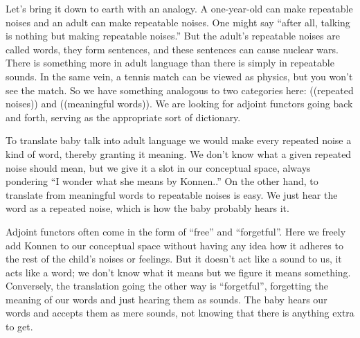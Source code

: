 \documentclass[CT4S-EN-RU]{subfiles}
\begin{document}
\begin{blockRUS}
\end{blockRUS}

\begin{blockENG}
Let's bring it down to earth with an analogy. A one-year-old can make repeatable noises and an adult can make repeatable noises. One might say “after all, talking is nothing but making repeatable noises.” But the adult's repeatable noises are called words, they form sentences, and these sentences can cause nuclear wars. There is something more in adult language than there is simply in repeatable sounds. In the same vein, a tennis match can be viewed as physics, but you won't see the match. So we have something analogous to two categories here: ((repeated noises)) and ((meaningful words)). We are looking for adjoint functors going back and forth, serving as the appropriate sort of dictionary.
\end{blockENG}

\begin{blockRUS}
\end{blockRUS}

\begin{blockENG}
To translate baby talk into adult language we would make every repeated noise a kind of word, thereby granting it meaning. We don't know what a given repeated noise should mean, but we give it a slot in our conceptual space, always pondering “I wonder what she means by Konnen..” On the other hand, to translate from meaningful words to repeatable noises is easy. We just hear the word as a repeated noise, which is how the baby probably hears it.
\end{blockENG}

\begin{blockRUS}
\end{blockRUS}

\begin{blockENG}
Adjoint functors often come in the form of “free” and “forgetful”. Here we freely add Konnen to our conceptual space without having any idea how it adheres to the rest of the child's noises or feelings. But it doesn't act like a sound to us, it acts like a word; we don't know what it means but we figure it means something. Conversely, the translation going the other way is “forgetful”, forgetting the meaning of our words and just hearing them as sounds. The baby hears our words and accepts them as mere sounds, not knowing that there is anything extra to get.
\end{blockENG}
\end{document}
